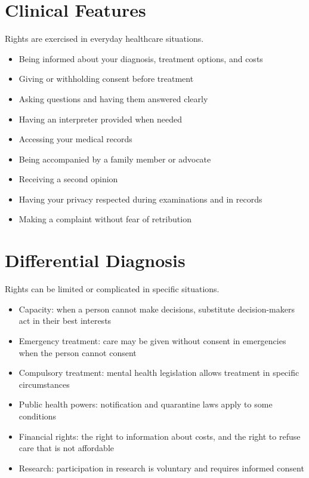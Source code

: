 \section*{Clinical Features}
Rights are exercised in everyday healthcare situations.

\begin{itemize}
    \item Being informed about your diagnosis, treatment options, and costs
    \item Giving or withholding consent before treatment
    \item Asking questions and having them answered clearly
    \item Having an interpreter provided when needed
    \item Accessing your medical records
    \item Being accompanied by a family member or advocate
    \item Receiving a second opinion
    \item Having your privacy respected during examinations and in records
    \item Making a complaint without fear of retribution
\end{itemize}

\section*{Differential Diagnosis}
Rights can be limited or complicated in specific situations.

\begin{itemize}
    \item Capacity: when a person cannot make decisions, substitute decision-makers act in their best interests
    \item Emergency treatment: care may be given without consent in emergencies when the person cannot consent
    \item Compulsory treatment: mental health legislation allows treatment in specific circumstances
    \item Public health powers: notification and quarantine laws apply to some conditions
    \item Financial rights: the right to information about costs, and the right to refuse care that is not affordable
    \item Research: participation in research is voluntary and requires informed consent
\end{itemize}

